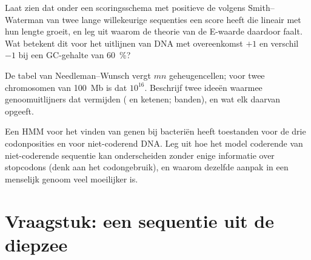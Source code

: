 \begin{exercise}[$\star\star\star$]\label{exo:b3:bioinformatics:10}
Laat zien dat onder een scoringsschema met positieve  de
 volgens Smith--Waterman van twee lange willekeurige
sequenties een score heeft die lineair met hun lengte groeit, en leg
uit waarom de theorie van de E-waarde daardoor faalt. Wat betekent dit
voor het uitlijnen van DNA met overeenkomst $+1$ en verschil $-1$ bij
een GC-gehalte van \qty{60}{\%}?
\end{exercise}

\begin{exercise}[$\star\star\star$]\label{exo:b3:bioinformatics:11}
De tabel van Needleman--Wunsch vergt $mn$ geheugencellen; voor twee
chromosomen van \qty{100}{Mb} is dat $10^{16}$. Beschrijf twee ideeën
waarmee genoomuitlijners dat vermijden ( en ketenen; banden), en
wat elk daarvan opgeeft.
\end{exercise}

\begin{exercise}[$\star\star\star$]\label{exo:b3:bioinformatics:12}
Een HMM voor het vinden van genen bij bacteriën heeft toestanden voor
de drie codonposities en voor niet-coderend DNA. Leg uit hoe het model
coderende van niet-coderende sequentie kan onderscheiden zonder enige
informatie over stopcodons (denk aan het codongebruik), en waarom
dezelfde aanpak in een menselijk genoom veel moeilijker is.
\end{exercise}

\section{Vraagstuk: een sequentie uit de diepzee}

